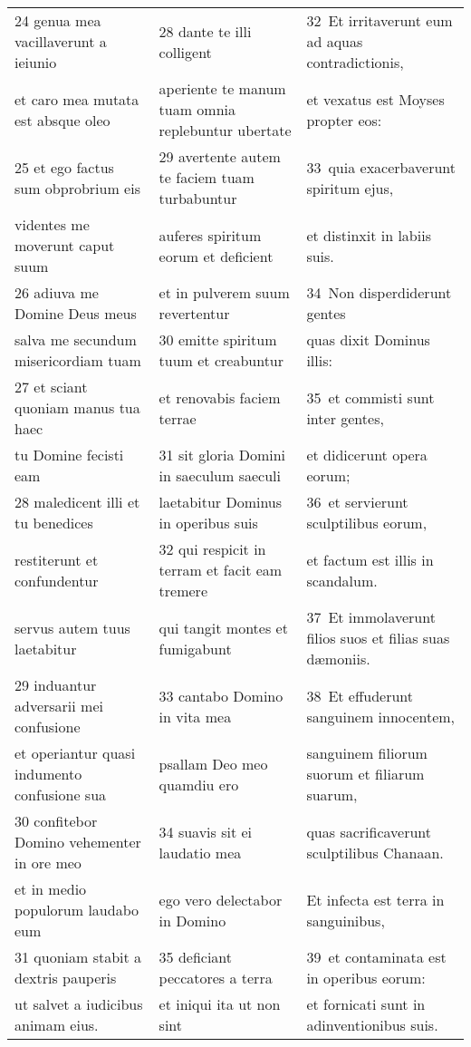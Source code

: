 \documentclass{article}
\begin{document}
\begin{longtable}{@{}p{}p{}p{}@{}}
24 genua mea vacillaverunt a ieiunio	&	28 dante te illi colligent	&	32 Et irritaverunt eum ad aquas contradictionis,	\\
et caro mea mutata est absque oleo	&	aperiente te manum tuam omnia replebuntur ubertate	&	et vexatus est Moyses propter eos:	\\
25 et ego factus sum obprobrium eis	&	29 avertente autem te faciem tuam turbabuntur	&	33 quia exacerbaverunt spiritum ejus,	\\
videntes me moverunt caput suum	&	auferes spiritum eorum et deficient	&	et distinxit in labiis suis.	\\
26 adiuva me Domine Deus meus	&	et in pulverem suum revertentur	&	34 Non disperdiderunt gentes	\\
salva me secundum misericordiam tuam	&	30 emitte spiritum tuum et creabuntur	&	quas dixit Dominus illis:	\\
27 et sciant quoniam manus tua haec	&	et renovabis faciem terrae	&	35 et commisti sunt inter gentes,	\\
tu Domine fecisti eam	&	31 sit gloria Domini in saeculum saeculi	&	et didicerunt opera eorum;	\\
28 maledicent illi et tu benedices	&	laetabitur Dominus in operibus suis	&	36 et servierunt sculptilibus eorum,	\\
restiterunt et confundentur	&	32 qui respicit in terram et facit eam tremere	&	et factum est illis in scandalum.	\\
servus autem tuus laetabitur	&	qui tangit montes et fumigabunt	&	37 Et immolaverunt filios suos et filias suas dæmoniis.	\\
29 induantur adversarii mei confusione	&	33 cantabo Domino in vita mea	&	38 Et effuderunt sanguinem innocentem,	\\
et operiantur quasi indumento confusione sua	&	psallam Deo meo quamdiu ero	&	sanguinem filiorum suorum et filiarum suarum,	\\
30 confitebor Domino vehementer in ore meo	&	34 suavis sit ei laudatio mea	&	quas sacrificaverunt sculptilibus Chanaan.	\\
et in medio populorum laudabo eum	&	ego vero delectabor in Domino	&	Et infecta est terra in sanguinibus,	\\
31 quoniam stabit a dextris pauperis	&	35 deficiant peccatores a terra	&	39 et contaminata est in operibus eorum:	\\
ut salvet a iudicibus animam eius.	&	et iniqui ita ut non sint	&	et fornicati sunt in adinventionibus suis.	\\

\end{longtable}
\end{document}
